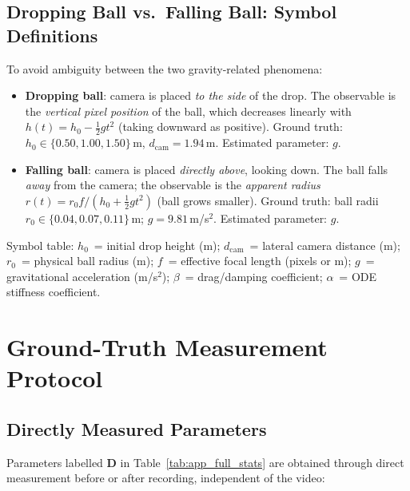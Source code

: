 \documentclass[runningheads]{llncs}
\begin{document}
\subsection{Dropping Ball vs.\ Falling Ball: Symbol Definitions}
\label{app:drop_vs_fall}

To avoid ambiguity between the two gravity-related phenomena:

\begin{itemize}[noitemsep]
  \item \textbf{Dropping ball}: camera is placed \emph{to the side} of the
    drop. The observable is the \emph{vertical pixel position} of the ball,
    which decreases linearly with $h(t) = h_0 - \tfrac{1}{2}g t^2$ (taking
    downward as positive). Ground truth: $h_0 \in \{0.50, 1.00, 1.50\}$\,m,
    $d_{\mathrm{cam}} = 1.94$\,m.  Estimated parameter: $g$.

  \item \textbf{Falling ball}: camera is placed \emph{directly above}, looking
    down. The ball falls \emph{away} from the camera; the observable is the
    \emph{apparent radius} $r(t) = r_0 f / (h_0 + \tfrac{1}{2}g t^2)$ (ball
    grows smaller). Ground truth: ball radii $r_0 \in \{0.04, 0.07, 0.11\}$\,m;
    $g = 9.81$\,m/s$^2$. Estimated parameter: $g$.
\end{itemize}

Symbol table: $h_0$~= initial drop height (m); $d_{\mathrm{cam}}$~= lateral
camera distance (m); $r_0$~= physical ball radius (m); $f$~= effective focal
length (pixels or m); $g$~= gravitational acceleration (m/s$^2$); $\beta$~=
drag/damping coefficient; $\alpha$~= ODE stiffness coefficient.


\section{Ground-Truth Measurement Protocol}
\label{app:measurement_protocol}

\subsection{Directly Measured Parameters}
\label{app:direct_measurement}

Parameters labelled \textbf{D} in Table~\ref{tab:app_full_stats} are
obtained through direct measurement before or after recording, independent
of the video:
\end{document}
